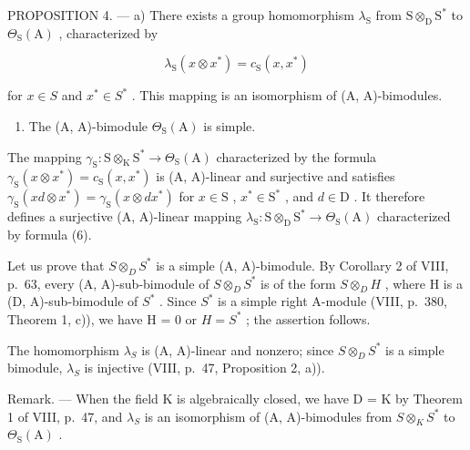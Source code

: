 PROPOSITION 4. --- a) There exists a group homomorphism \(\lambda_{\mathrm{S}}\) from \(\mathrm{S} \otimes_{\mathrm{D}} \mathrm{S}^{*}\) to \(\Theta_{\mathrm{S}}(\mathrm{A})\) , characterized by

\[
\lambda_ {\mathrm{S}} (x \otimes x ^ {*}) = c _ {\mathrm{S}} (x, x ^ {*})\tag{6}
\]

for \(x \in S\) and \(x^{*} \in S^{*}\) . This mapping is an isomorphism of (A, A)-bimodules.

\begin{enumerate}
\def\labelenumi{\alph{enumi})}
\setcounter{enumi}{1}
\tightlist
\item
  The (A, A)-bimodule \(\Theta_{\mathrm{S}}(\mathrm{A})\) is simple.
\end{enumerate}

The mapping \(\gamma_{\mathrm{S}}: \mathrm{S} \otimes_{\mathrm{K}} \mathrm{S}^{*} \to \Theta_{\mathrm{S}}(\mathrm{A})\) characterized by the formula \(\gamma_{\mathrm{S}}(x \otimes x^{*}) = c_{\mathrm{S}}(x, x^{*})\) is (A, A)-linear and surjective and satisfies \(\gamma_{\mathrm{S}}(xd \otimes x^{*}) = \gamma_{\mathrm{S}}(x \otimes dx^{*})\) for \(x \in \mathrm{S}\) , \(x^{*} \in \mathrm{S}^{*}\) , and \(d \in \mathrm{D}\) . It therefore defines a surjective (A, A)-linear mapping \(\lambda_{\mathrm{S}}: \mathrm{S} \otimes_{\mathrm{D}} \mathrm{S}^{*} \to \Theta_{\mathrm{S}}(\mathrm{A})\) characterized by formula (6).

Let us prove that \(S \otimes_{D} S^{*}\) is a simple (A, A)-bimodule. By Corollary 2 of VIII, p.~63, every (A, A)-sub-bimodule of \(S \otimes_{D} S^{*}\) is of the form \(S \otimes_{D} H\) , where H is a (D, A)-sub-bimodule of \(S^{*}\) . Since \(S^{*}\) is a simple right A-module (VIII, p.~380, Theorem 1, c)), we have H = 0 or \(H = S^{*}\) ; the assertion follows.

The homomorphism \(\lambda_{S}\) is (A, A)-linear and nonzero; since \(S \otimes_{D} S^{*}\) is a simple bimodule, \(\lambda_{S}\) is injective (VIII, p.~47, Proposition 2, a)).

Remark. --- When the field K is algebraically closed, we have D = K by Theorem 1 of VIII, p.~47, and \(\lambda_{S}\) is an isomorphism of (A, A)-bimodules from \(S \otimes_{K} S^{*}\) to \(\Theta_{\mathrm{S}}(\mathrm{A})\) .
